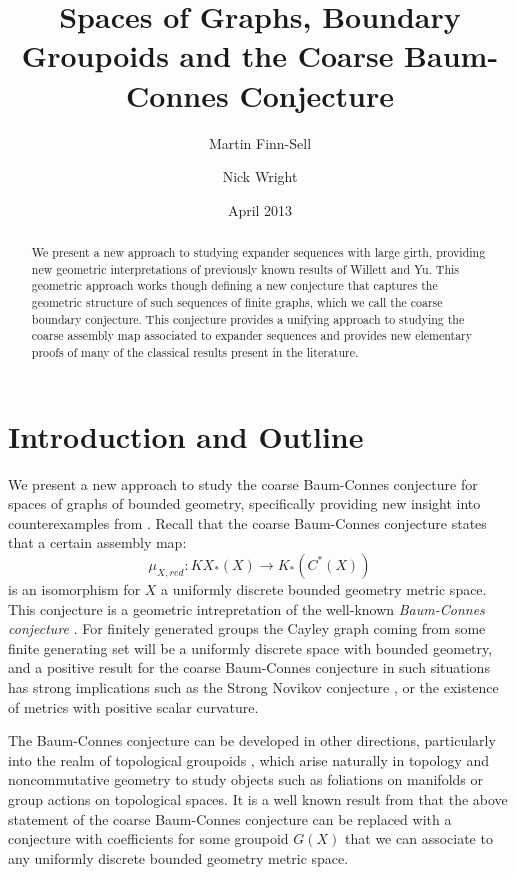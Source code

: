 \documentclass[11pt]{amsart}
\title{Spaces of Graphs, Boundary Groupoids and the Coarse Baum-Connes Conjecture}
\date{April 2013}
\author{Martin Finn-Sell \and Nick Wright}
\theoremstyle{plain}
\theoremstyle{definition}%
\theoremstyle{remark}%
\begin{document}

\begin{abstract}
We present a new approach to studying expander sequences with large girth, providing new geometric interpretations of previously known results of Willett and Yu. This geometric approach works though defining a new conjecture that captures the geometric structure of such sequences of finite graphs, which we call the coarse boundary conjecture. This conjecture provides a unifying approach to studying the coarse assembly map associated to expander sequences and provides new elementary proofs of many of the classical results present in the literature.
\end{abstract}

\maketitle

\section{Introduction and Outline}

We present a new approach to study the coarse Baum-Connes conjecture for spaces of graphs of bounded geometry, specifically providing new insight into counterexamples from \cite{higsonpreprint,MR1911663,explg1}. Recall that the coarse Baum-Connes conjecture states that a certain assembly map:
\begin{equation*}
\mu_{X,red}:KX_{*}(X) \longrightarrow K_{*}(C^{*}(X))
\end{equation*}
is an isomorphism for $X$ a uniformly discrete bounded geometry metric space. This conjecture is a geometric intrepretation of the well-known \textit{Baum-Connes conjecture} \cite{MR1292018}. For finitely generated groups the Cayley graph coming from some finite generating set will be a uniformly discrete space with bounded geometry, and a positive result for the coarse Baum-Connes conjecture in such situations has strong implications such as the Strong Novikov conjecture \cite{MR866507}, or the existence of metrics with positive scalar curvature.

The Baum-Connes conjecture can be developed in other directions, particularly into the realm of topological groupoids \cite{MR1798599}, which arise naturally in topology and noncommutative geometry to study objects such as foliations on manifolds or group actions on topological spaces. It is a well known result from \cite{MR1905840} that the above statement of the coarse Baum-Connes conjecture can be replaced with a conjecture with coefficients for some groupoid $G(X)$ that we can associate to any uniformly discrete bounded geometry metric space.
\end{document}
